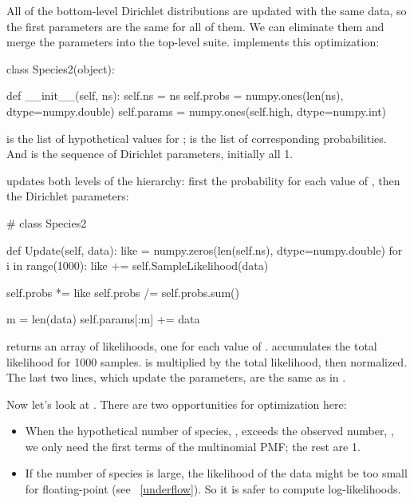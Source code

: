 \documentclass[12pt]{book}
\theoremstyle{exercise}
\begin{document}
All of the bottom-level Dirichlet distributions are updated
with the same data, so the first  parameters are the same for
all of them.  
We can eliminate them and merge the parameters into
the top-level suite.   implements this optimization:

\begin{code}
class Species2(object):
    
    def __init__(self, ns):
        self.ns = ns
        self.probs = numpy.ones(len(ns), dtype=numpy.double)
        self.params = numpy.ones(self.high, dtype=numpy.int)
\end{code}

 is the list of hypothetical values for ;
 is the list of corresponding probabilities.  And
 is the sequence of Dirichlet parameters, initially
all 1.

 updates both levels of
the hierarchy: first the probability for each value of ,
then the Dirichlet parameters:

\begin{code}
# class Species2

    def Update(self, data):
        like = numpy.zeros(len(self.ns), dtype=numpy.double)
        for i in range(1000):
            like += self.SampleLikelihood(data)

        self.probs *= like
        self.probs /= self.probs.sum()

        m = len(data)
        self.params[:m] += data
\end{code}

 returns an array of likelihoods, one for each
value of .   accumulates the total likelihood for
1000 samples.   is multiplied by the total likelihood,
then normalized.  The last two lines, which update the parameters,
are the same as in .

Now let's look at .  There are two
opportunities for optimization here:

\begin{itemize}

\item When the hypothetical number of species, ,
exceeds the observed number, , we only need the first 
terms of the multinomial PMF; the rest are 1.

\item If the number of species is large, the likelihood of the data
  might be too small for floating-point (see ~\ref{underflow}).  So it
  is safer to compute log-likelihoods.
   

\end{itemize}
\end{document}
